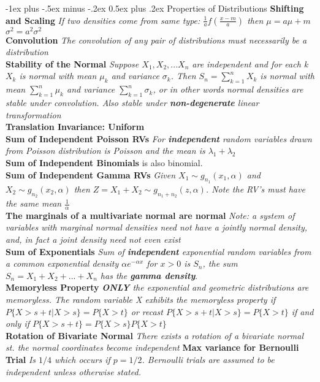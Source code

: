 \documentclass[10pt,landscape]{article}
\makeatletter
\renewcommand{\section}{\@startsection{section}{1}{0mm}%
                                {-1ex plus -.5ex minus -.2ex}%
                                {0.5ex plus .2ex}%
                                {\normalfont\large\bfseries}}
\makeatother
\begin{document}
\begin{multicols*}{3}
\section{Properties of Distributions}
\textbf{Shifting and Scaling} \textit{If two densities come from same type: $\frac{1}{a}f(\frac{x-m}{a})$ then $\mu =a\mu +m$ $\sigma^2=a^2\sigma^2$}\\
\textbf{Convolution }\textit{The convolution of any pair of distributions must necessarily be a distribution}\\
\textbf{Stability of the Normal}
\textit{Suppose $X_1,X_2,...X_n$ are independent and for each k $X_k$ is normal with mean $\mu_k$ and variance $\sigma_k$. Then $S_n = \sum_{k=1}^{n}X_k$ is normal with mean $\sum_{k=1}^{n} \mu_k$ and variance  $\sum_{k=1}^{n} \sigma_k$, or in other words normal densities are stable under convolution. Also stable under \textbf{non-degenerate} linear transformation}\\
\textbf{Translation Invariance: Uniform}\\
\textbf{Sum of Independent Poisson RVs}
\textit{For \textbf{independent} random variables drawn from Poisson distribution is Poisson and the mean is $\lambda_1 + \lambda_2$}\\
\textbf{Sum of Independent Binomials} is also binomial.\\
\textbf{Sum of Independent Gamma RVs}
\textit{Given $X_1 \sim g_{n_1}(x_1,\alpha)$ and $X_2 \sim g_{n_2}(x_2,\alpha)$ then $Z=X_1+X_2 \sim g_{n_1+n_2}(z,\alpha)$. Note the RV's must have the same mean $\frac{1}{\alpha}$}\\
\textbf{The marginals of a multivariate normal are normal }\textit{Note: a system of variables with marginal normal densities need not have a jointly normal density, and, in fact a joint density need not even exist}\\
\textbf{Sum of Exponentials} \textit{Sum of \textbf{independent} exponential random variables from a common exponential density $\alpha e^{-\alpha x}$ for $x>0$ is $S_n$, the sum $S_n= X_1+X_2+...+X_n$ has the \textbf{gamma density}}.\\
\textbf{Memoryless Property} \textit{\textbf{ONLY} the exponential and geometric distributions are memoryless. The random variable X exhibits the memoryless property if $P\{X>s+t|X>s\}=P\{X>t\}$ or recast
	$P\{X>s+t | X>s\}=P\{X>t\}$ if and only if $P\{X>s+t\}=P\{X>s\}P\{X>t\}$}\\
\textbf{Rotation of Bivariate Normal} \textit{There exists a rotation of a bivariate normal st. the normal coordinates become independent}
\textbf{Max variance for Bernoulli Trial} \textit{Is $1/4$ which occurs if $p=1/2$. Bernoulli trials are assumed to be independent unless otherwise stated.}


\end{multicols*}
\end{document}
